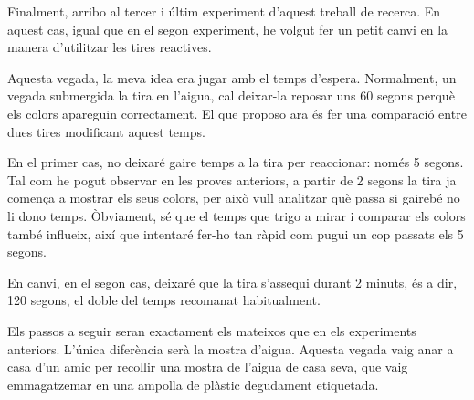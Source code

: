 Finalment, arribo al tercer i últim experiment d’aquest treball de recerca. En aquest cas, igual que en el segon experiment, he volgut fer un petit canvi en la manera d’utilitzar les tires reactives.

Aquesta vegada, la meva idea era jugar amb el temps d’espera. Normalment, un vegada submergida la tira en l’aigua, cal deixar-la reposar uns 60 segons perquè els colors apareguin correctament. El que proposo ara és fer una comparació entre dues tires modificant aquest temps.

En el primer cas, no deixaré gaire temps a la tira per reaccionar: només 5 segons. Tal com he pogut observar en les proves anteriors, a partir de 2 segons la tira ja comença a mostrar els seus colors, per això vull analitzar què passa si gairebé no li dono temps. Òbviament, sé que el temps que trigo a mirar i comparar els colors també influeix, així que intentaré fer-ho tan ràpid com pugui un cop passats els 5 segons.

En canvi, en el segon cas, deixaré que la tira s’assequi durant 2 minuts, és a dir, 120 segons, el doble del temps recomanat habitualment.

Els passos a seguir seran exactament els mateixos que en els experiments anteriors. L’única diferència serà la mostra d’aigua. Aquesta vegada vaig anar a casa d’un amic per recollir una mostra de l’aigua de casa seva, que vaig emmagatzemar en una ampolla de plàstic degudament etiquetada.

